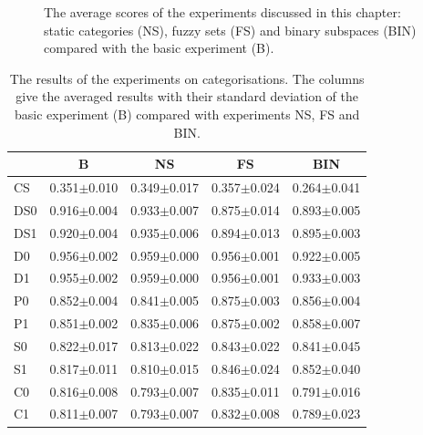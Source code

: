 \begin{figure}
\caption{The average scores of the experiments discussed in this chapter: static categories (NS), fuzzy sets (FS) and binary subspaces (BIN) compared with the basic experiment (B).}
\label{f:par:cat}
\end{figure}

\begin{table}[t]
\centering
\begin{tabular}{||l|c|c|c|c||}
\hline\hline
        & B               &   NS             &  FS             &  BIN\\\hline
CS      & 0.351$\pm$0.010 &   0.349$\pm$0.017&  0.357$\pm$0.024&  0.264$\pm$0.041\\\hline
DS0     & 0.916$\pm$0.004 &   0.933$\pm$0.007&  0.875$\pm$0.014&  0.893$\pm$0.005\\\hline
DS1     & 0.920$\pm$0.004 &   0.935$\pm$0.006&  0.894$\pm$0.013&  0.895$\pm$0.003\\\hline
D0      & 0.956$\pm$0.002 &   0.959$\pm$0.000&  0.956$\pm$0.001&  0.922$\pm$0.005\\\hline
D1      & 0.955$\pm$0.002 &   0.959$\pm$0.000&  0.956$\pm$0.001&  0.933$\pm$0.003\\\hline
P0      & 0.852$\pm$0.004 &   0.841$\pm$0.005&  0.875$\pm$0.003&  0.856$\pm$0.004\\\hline
P1      & 0.851$\pm$0.002 &   0.835$\pm$0.006&  0.875$\pm$0.002&  0.858$\pm$0.007\\\hline
S0      & 0.822$\pm$0.017 &   0.813$\pm$0.022&  0.843$\pm$0.022&  0.841$\pm$0.045\\\hline
S1      & 0.817$\pm$0.011 &   0.810$\pm$0.015&  0.846$\pm$0.024&  0.852$\pm$0.040\\\hline
C0      & 0.816$\pm$0.008 &   0.793$\pm$0.007&  0.835$\pm$0.011&  0.791$\pm$0.016\\\hline
C1      & 0.811$\pm$0.007 &   0.793$\pm$0.007&  0.832$\pm$0.008&  0.789$\pm$0.023\\\hline
\hline
\end{tabular}
\caption{The results of the experiments on categorisations. The columns give the averaged results with their standard deviation of the basic experiment (B) compared with experiments NS, FS and BIN.}
\label{t:par:cat}
\end{table}


